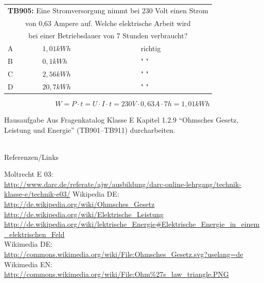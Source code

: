 \begin{frame}
	\begin{small}	
	\begin{tabular}{|l|l|l|}
	\hline
		\multicolumn{3}{|c|}{\textbf{TB905:} Eine Stromversorgung nimmt bei 230 Volt einen Strom }\\
		\multicolumn{3}{|c|}{von 0,63 Ampere auf. Welche elektrische Arbeit  wird }\\
		\multicolumn{3}{|c|}{bei einer Betriebsdauer von 7 Stunden verbraucht?}\\
		\hline
		A & $1,01 kWh$ & richtig \\ \hline
		B & $0,1 kWh $ & " " \\ \hline
		C & $2,56 kWh$ & " " \\ \hline
		D & $20,7 kWh$ & " " \\ \hline	
	\end{tabular}
	\end{small}
	\vspace{1cm}
	\begin{equation}
		W = P \cdot t = U \cdot I \cdot t = 230V \cdot 0,63A \cdot 7h = 1,01kWh
	\end{equation}
\end{frame}

\begin{frame}
  \begin{alertblock}{Hausaufgabe}
    Aus Fragenkatalog Klasse E Kapitel 1.2.9 ``Ohmsches Gesetz, Leistung und Energie'' (TB901--TB911) durcharbeiten.
  \end{alertblock}
\end{frame}

\renewcommand{\refname}{Referenzen}

\hypertarget{refs}{}
\textcolor{white}{} \\ %
\Large Referenzen/Links
\footnotesize

\begin{thebibliography}{}
       Moltrecht E 03: \\
                    \url{http://www.darc.de/referate/ajw/ausbildung/darc-online-lehrgang/technik-klasse-e/technik-e03/}
        Wikipedia DE: \\
                    \url{http://de.wikipedia.org/wiki/Ohmsches_Gesetz}\\ 
                    \url{http://de.wikipedia.org/wiki/Elektrische_Leistung}\\ 
                    \url{http://de.wikipedia.org/wiki/lektrische_Energie#Elektrische_Energie_in_einem_elektrischen_Feld}\\ 
    	Wikimedia DE:\\
    				\url{http://commons.wikimedia.org/wiki/File:Ohmsches_Gesetz.svg?uselang=de}\\
   		Wikimedia EN:\\
   					\url{http://commons.wikimedia.org/wiki/File:Ohm\%27s_law_triangle.PNG}\\
\end{thebibliography} 


